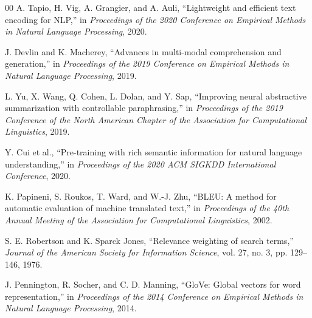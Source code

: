\documentclass[conference]{IEEEtran}
\begin{document}
\begin{thebibliography}{00}
 A. Tapio, H. Vig, A. Grangier, and A. Auli, ``Lightweight and efficient text encoding for NLP,'' in \textit{Proceedings of the 2020 Conference on Empirical Methods in Natural Language Processing}, 2020.

 J. Devlin and K. Macherey, ``Advances in multi-modal comprehension and generation,'' in \textit{Proceedings of the 2019 Conference on Empirical Methods in Natural Language Processing}, 2019.

 L. Yu, X. Wang, Q. Cohen, L. Dolan, and Y. Sap, ``Improving neural abstractive summarization with controllable paraphrasing,'' in \textit{Proceedings of the 2019 Conference of the North American Chapter of the Association for Computational Linguistics}, 2019.

 Y. Cui et al., ``Pre-training with rich semantic information for natural language understanding,'' in \textit{Proceedings of the 2020 ACM SIGKDD International Conference}, 2020.

 K. Papineni, S. Roukos, T. Ward, and W.-J. Zhu, ``BLEU: A method for automatic evaluation of machine translated text,'' in \textit{Proceedings of the 40th Annual Meeting of the Association for Computational Linguistics}, 2002.

 S. E. Robertson and K. Sparck Jones, ``Relevance weighting of search terms,'' \textit{Journal of the American Society for Information Science}, vol. 27, no. 3, pp. 129--146, 1976.

 J. Pennington, R. Socher, and C. D. Manning, ``GloVe: Global vectors for word representation,'' in \textit{Proceedings of the 2014 Conference on Empirical Methods in Natural Language Processing}, 2014.

\end{thebibliography}
\end{document}
